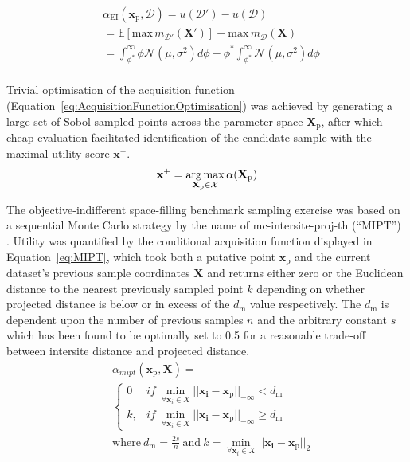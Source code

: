 \footnotesize
\begin{equation}\label{eq:ExpectedImprovement}
    \begin{split}
        &\alpha_{\mathrm{EI}}(\mathbf{x}_{\mathrm{p}},\mathcal{D})=u(\mathcal{D'})-u(\mathcal{D})\\
        &=\mathbb{E}[\mathrm{max}\,m_{\mathcal{D}'}(\mathbf{X}')]-\mathrm{max}\,m_{\mathcal{D}}(\mathbf{X})\\
        &=\int_{\phi^{*}}^{\infty}\phi\mathcal{N}(\mu,\sigma^{2})d\phi-\phi^{*}\int_{\phi^{*}}^{\infty}\mathcal{N}(\mu,\sigma^{2})d\phi\\
    \end{split}
\end{equation}
\normalsize

Trivial optimisation of the acquisition function
(Equation~\ref{eq:AcquisitionFunctionOptimisation}) was achieved by
 generating a large set of Sobol sampled points across the parameter space
 \(\mathbf{X}_{\mathrm{p}}\), after which cheap evaluation facilitated identification of
 the candidate sample with the maximal utility score \(\mathbf{x}^{+}\).
\begin{equation}\label{eq:AcquisitionFunctionOptimisation}
    \mathbf{x}^{+}=\operatorname*{arg\,max}_{\mathbf{X}_{\mathrm{p}}\in\mathcal{X}}\alpha(\mathbf{X}_{\mathrm{p}})
\end{equation}

The objective-indifferent space-filling benchmark sampling exercise was based
 on a sequential Monte Carlo strategy by the name of mc-intersite-proj-th
 (``MIPT'') \autocite{Crombecq2011}.
Utility was quantified by the conditional acquisition function displayed
 in Equation~\ref{eq:MIPT}, which took both a putative point
 \(\mathbf{x}_{\mathrm{p}}\) and the current dataset's previous sample coordinates
 \(\mathbf{X}\) and returns either zero or the Euclidean distance to the
 nearest previously sampled point \(k\) depending on whether projected
 distance is below or in excess of the \(d_{\mathrm{m}}\) value respectively.
The \(d_{\mathrm{m}}\) is dependent upon the number of previous samples \(n\) and the
 arbitrary constant \(s\) which has been found to be optimally set to 0.5
 for a reasonable trade-off between intersite distance and projected
 distance.
\footnotesize
\begin{equation}\label{eq:MIPT}
    \begin{split}
        &\alpha_{mipt}(\mathbf{x}_{\mathrm{p}},\mathbf{X}) =\\
        &\begin{cases}
            0       & if\:\min\limits_{\forall \mathbf{x}_i \in X}||\mathbf{x_{i}-\mathbf{x_{\mathrm{p}}}}||_{-\infty}<d_{\mathrm{m}}\\
            k,      & if\:\min\limits_{\forall \mathbf{x}_i \in X}||\mathbf{x_{i}-\mathbf{x_{\mathrm{p}}}}||_{-\infty}\ge d_{\mathrm{m}}
         \end{cases}\\
        &\mathrm{where}\:d_{\mathrm{m}}=\frac{2s}{n}\:\mathrm{and}\:k=\min\limits_{\forall \mathbf{x}_i \in X}||\mathbf{x_{i}-\mathbf{x_{\mathrm{p}}}}||_{2}
    \end{split}
\end{equation}
\normalsize

